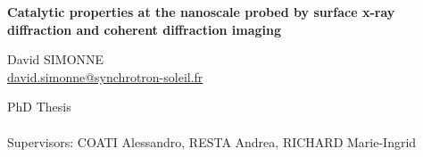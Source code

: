 \begin{titlepage}
\begin{center}
        {\begin{spacing}{1.0}
        \LARGE \textbf{Catalytic properties at the nanoscale probed by surface x-ray diffraction and coherent diffraction imaging}
        \end{spacing}}
        
        \vspace{1.1cm}
        David SIMONNE\\
        \url{david.simonne@synchrotron-soleil.fr}
                
        \vspace{1.0cm}
    \end{center}


\vfill
\textcolor[rgb]{0.5,0.5,0.5}{
    \begin{flushleft}
    { \footnotesize
    PhD Thesis\\
    \thedate\\
    Supervisors: COATI Alessandro, RESTA Andrea, RICHARD Marie-Ingrid\\
    }
    \end{flushleft}
}
      
\end{titlepage}